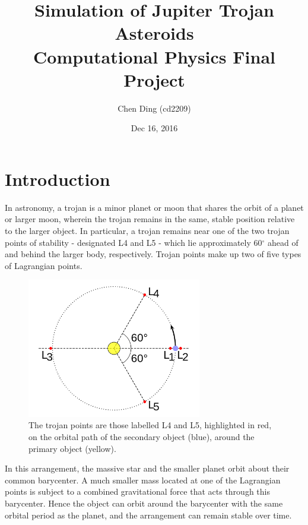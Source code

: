 \documentclass[12pt,a4paper]{article}
\begin{document}
\title{Simulation of Jupiter Trojan Asteroids \\ \large Computational Physics Final Project}
\author{Chen Ding (cd2209)}
\date{Dec 16, 2016}
\maketitle

\section{Introduction}

In astronomy, a trojan is a minor planet or moon that shares the orbit of a planet or larger moon, wherein the trojan remains in the same, stable position relative to the larger object. In particular, a trojan remains near one of the two trojan points of stability - designated L4 and L5 - which lie approximately 60$^{\circ}$ ahead of and behind the larger body, respectively. Trojan points make up two of five types of Lagrangian points.

\begin{figure}[H]
\centering
\includegraphics[width=3in]{500px-Lagrange_very_massive.png}
\caption{The trojan points are those labelled L4 and L5, highlighted in red, on the orbital path of the secondary object (blue), around the primary object (yellow).}
\end{figure}


In this arrangement, the massive star and the smaller planet orbit about their common barycenter. A much smaller mass located at one of the Lagrangian points is subject to a combined gravitational force that acts through this barycenter. Hence the object can orbit around the barycenter with the same orbital period as the planet, and the arrangement can remain stable over time.
\end{document}
